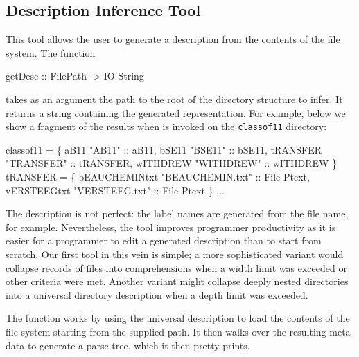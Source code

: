 \subsection{Description Inference Tool}
This tool allows the user to generate a \forest{} description from the
contents of the file system.   The function
\begin{code}
getDesc :: FilePath -> IO String
\end{code}
takes as an argument the path to the root of the directory structure
to infer.  It returns a string containing the generated
representation.  For example, below we show a fragment of the
results when
 is invoked on the \texttt{classof11} directory:
\begin{code}
 classof11 =  \{
    aB11  "AB11" :: aB11,
    bSE11  "BSE11" :: bSE11,
    tRANSFER  "TRANSFER" :: tRANSFER,
    wITHDREW  "WITHDREW" :: wITHDREW
\}
 tRANSFER =  \{
    bEAUCHEMINtxt  "BEAUCHEMIN.txt" :: File Ptext,
    vERSTEEGtxt  "VERSTEEG.txt" :: File Ptext
\}
...
\end{code}
The description is not perfect: the label names are generated 
from the file name, for example.  Nevertheless, the tool improves
programmer productivity as it is
easier for a programmer to edit a generated description than to
start from scratch.   Our first tool in this vein is simple;
a more sophisticated variant would collapse records of files
into comprehensions when a width limit was exceeded or
other criteria were met.  Another variant might
collapse deeply nested directories into a universal directory
description when a depth limit was exceeded.

The  function works by using the universal description to
load the contents of the file system starting from the supplied path.
It then walks over the resulting meta-data to generate a \forest{}
parse tree, which it then pretty prints.



